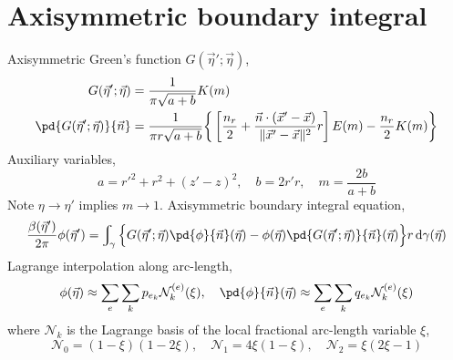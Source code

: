 \documentclass{jfm}
\begin{document}
\section{Axisymmetric boundary integral}
Axisymmetric Green's function $G(\vec{\eta}';\vec{\eta})$,
\begin{align}
G(\vec{\eta}';\vec{\eta})&=\frac{1}{\pi\sqrt{a+b}}K(m)\\
\pd{G(\vec{\eta}';\vec{\eta})}{\vec{n}}&=
\frac{1}{\pi r\sqrt{a+b}}\bigg\{
\left[\frac{n_r}{2}+\frac{\vec{n}\cdot(\vec{x}'-\vec{x})}{\|\vec{x}'-\vec{x}\|^2}r\right]E(m)
-\frac{n_r}{2}K(m)\bigg\}
\end{align}
Auxiliary variables,
\begin{equation}
a=r'^2+r^2+(z'-z)^2,\quad b = 2 r' r,\quad m =\frac{2 b}{a+b}
\end{equation}
Note $\eta\to\eta'$ implies $m\to 1$.
Axisymmetric boundary integral equation,
\begin{equation}
\frac{\beta(\vec{\eta}')}{2\pi}\phi(\vec{\eta}')=\int_{\gamma}
\Big\{
G(\vec{\eta}';\vec{\eta})\pd{\phi}{\vec{n}}(\vec{\eta})-
\phi(\vec{\eta})\pd{G(\vec{\eta}';\vec{\eta})}{\vec{n}}(\vec{\eta})
\Big\}
 r \,\mathrm{d}\gamma(\vec{\eta})
\end{equation}
Lagrange interpolation along arc-length,
\begin{equation}
\phi(\vec{\eta})\approx\sum_e \sum_k p_{e_k}\mathcal{N}^{(e)}_k(\xi),\quad
\pd{\phi}{\vec{n}}(\vec{\eta})\approx\sum_e \sum_kq_{e_k}\mathcal{N}^{(e)}_k(\xi)
\end{equation}
where $\mathcal{N}_k$ is the Lagrange basis of the local fractional arc-length variable $\xi$,
\begin{equation}
\mathcal{N}_0=(1 - \xi) (1 - 2\xi),\quad
\mathcal{N}_1=4 \xi (1 - \xi) ,\quad
\mathcal{N}_2=\xi (2 \xi- 1)
\end{equation}
\end{document}
